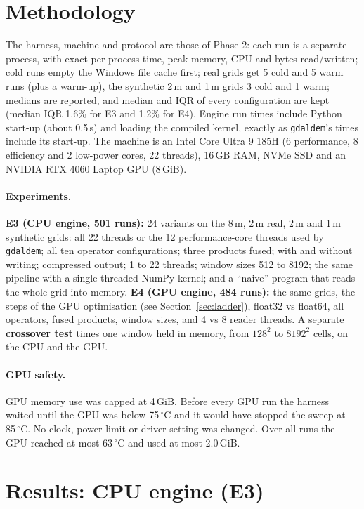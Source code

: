 ﻿\documentclass[11pt,a4paper]{article}
\begin{document}
\section{Methodology}
The harness, machine and protocol are those of Phase 2: each run is a separate process, with exact per-process
time, peak memory, CPU and bytes read/written; cold runs empty the Windows file cache first; real grids get 5 cold
and 5 warm runs (plus a warm-up), the synthetic 2\,m and 1\,m grids 3 cold and 1 warm; medians are reported, and
median and IQR of every configuration are kept (median IQR 1.6\% for E3 and 1.2\% for E4). Engine run times include
Python start-up (about 0.5\,s) and loading the compiled kernel, exactly as \texttt{gdaldem}'s times include its
start-up. The machine is an Intel Core Ultra 9 185H (6 performance, 8 efficiency and 2 low-power cores, 22 threads),
16\,GB RAM, NVMe SSD and an NVIDIA RTX 4060 Laptop GPU (8\,GiB).

\paragraph{Experiments.}
\textbf{E3 (CPU engine, 501 runs):} 24 variants on the 8\,m, 2\,m real, 2\,m and 1\,m synthetic grids: all 22
threads or the 12 performance-core threads used by \texttt{gdaldem}; all ten operator configurations; three products
fused; with and without writing; compressed output; 1 to 22 threads; window sizes 512 to 8192; the same pipeline with
a single-threaded NumPy kernel; and a ``naive'' program that reads the whole grid into memory.
\textbf{E4 (GPU engine, 484 runs):} the same grids, the steps of the GPU optimisation (see Section~\ref{sec:ladder}),
float32 vs float64, all operators, fused products, window sizes, and 4 vs 8 reader threads. A separate
\textbf{crossover test} times one window held in memory, from $128^2$ to $8192^2$ cells, on the CPU and the GPU.

\paragraph{GPU safety.} GPU memory use was capped at 4\,GiB. Before every GPU run the harness waited until the GPU
was below 75\,$^\circ$C and it would have stopped the sweep at 85\,$^\circ$C. No clock, power-limit or driver setting
was changed. Over all runs the GPU reached at most 63\,$^\circ$C and used at most 2.0\,GiB.

\section{Results: CPU engine (E3)}
\end{document}

